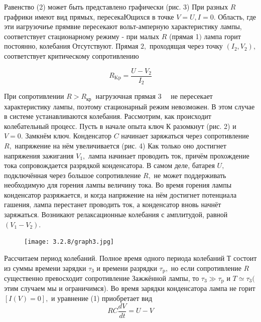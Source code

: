 \documentclass[a4paper,12pt]{article} %
\begin{document}
Равенство (2) может быть представлено графически (рис. 3) При разных $R$ графрики имеют вид прямых, пересекаЮщихся в точке $V=U, I=0 .$ Область, где эти иагрузочиъе прямвие пересекают вольт-амперную характеристику лампы, соответствует стационарному режиму - при малых $R$ (прямая 1$)$ лампа горит постоянно, колебания Отсутствуют. Прямая $2,$ проходящая через точку $\left(I_{2}, V_{2}\right),$ соответствует критическому сопротивлению

\begin{equation}
R_{\mathrm{Kp}}=\frac{U-V_{2}}{I_{2}}
\end{equation}

При сопротивлении $R>R_{\text {кр }}$ нагрузочная прямая $3 \quad$ не пересекает характеристику лампы, поэтому стационарный режим невозможен. В этом случае в системе устанавливаются колебания. Рассмотрим, как происходит колебательный процесс. Пусть в начале опыта ключ К разомкнут (рис. 2) и $V=0 .$ Замкнём ключ. Конденсатор $C$ начинает заряжаться через сопротивление $R,$ напряжение на нём увеличивается (рис. 4) Как только оно достигнет напряжения зажигания $V_{1},$ лампа начинает проводить ток, причём прохождение тока сопровождается разрядкой конденсатора. В самом деле, батарея $U,$ подключённая через большое сопротивление $R,$ не может поддерживать необходимую для горения лампы величину тока. Во время горения лампы конденсатор разряжается, и когда напряжение на нём достигнет потенциала гашения, лампа перестанет проводить ток, а конденсатор вновь начнёт заряжаться. Возникают релаксационные колебания с амплитудой, равной $\left(V_{1}-V_{2}\right) .$

\begin{figure} 
\begin{center}
\texttt{[image: 3.2.8/graph3.jpg]}
\caption{}
\end{center}
\end{figure}

Рассчитаем период колебаний. Полное время одного периода колебаний Т состоит из суммы времени зарядки $\tau_{3}$ и времени разрядки $\tau_{\mathrm{p}},$ но если сопротивление $R$ существенно превосходит сопротивление Зажжённой лампы, то $\tau_{3} \gg \tau_{\mathrm{p}}$ и $T \simeq \tau_{3}($ этим случаем мы и ограничимся). Во время зарядки конденсатора лампа не горит $[I(V)=0],$ и уравнение (1) приобретает вид
\begin{equation}
R C \frac{d V}{d t}=U-V    
\end{equation}
\end{document}
